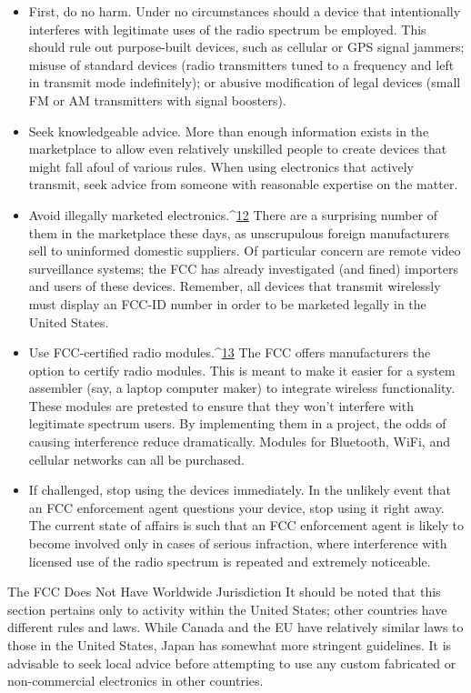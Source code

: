 \begin{itemize}
\item First, do no harm. Under no circumstances should a device that
intentionally interferes with legitimate uses of the radio spectrum
be employed. This should rule out purpose-built devices,
such as cellular or GPS signal jammers; misuse of standard
devices (radio transmitters tuned to a frequency and left in
transmit mode indefinitely); or abusive modification of legal
devices (small FM or AM transmitters with signal boosters).
\item Seek knowledgeable advice. More than enough information
exists in the marketplace to allow even relatively unskilled
people to create devices that might fall afoul of various rules.
When using electronics that actively transmit, seek advice from
someone with reasonable expertise on the matter.
\item Avoid illegally marketed electronics.^{\href{#endnotes-hord}{12}} There are a surprising
number of them in the marketplace these days, as unscrupulous
foreign manufacturers sell to uninformed domestic suppliers. Of
particular concern are remote video surveillance systems; the
FCC has already investigated (and fined) importers and users of
these devices. Remember, all devices that transmit wirelessly
must display an FCC-ID number in order to be marketed legally
in the United States.
\item Use FCC-certified radio modules.^{\href{#endnotes-hord}{13}} The FCC offers manufacturers
the option to certify radio modules. This is meant to make it
easier for a system assembler (say, a laptop computer maker) to
integrate wireless functionality. These modules are pretested to
ensure that they won't interfere with legitimate spectrum users.
By implementing them in a project, the odds of causing interference
reduce dramatically. Modules for Bluetooth, WiFi, and
cellular networks can all be purchased.
\item If challenged, stop using the devices immediately. In the unlikely
event that an FCC enforcement agent questions your device,
stop using it right away. The current state of affairs is such that
an FCC enforcement agent is likely to become involved only in
cases of serious infraction, where interference with licensed use
of the radio spectrum is repeated and extremely noticeable.
\end{itemize}
The FCC Does Not Have Worldwide Jurisdiction
It should be noted that this section pertains only to activity within the
United States; other countries have different rules and laws. While Canada
and the EU have relatively similar laws to those in the United States, Japan
has somewhat more stringent guidelines.
It is advisable to seek local advice before attempting to use any custom fabricated
or non-commercial electronics in other countries.

